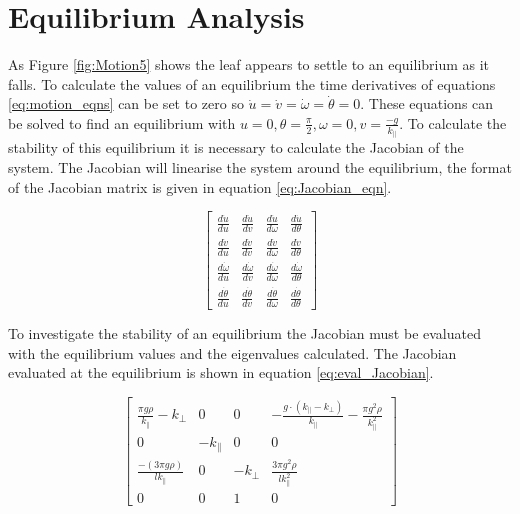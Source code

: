 \section{Equilibrium Analysis}

As Figure \ref{fig:Motion5} shows the leaf appears to settle to an equilibrium as it falls. To calculate the values of an equilibrium the time derivatives of equations \ref{eq:motion_eqns} %
can be set to zero so $\dot{u} = \dot{v} = \dot{\omega} = \dot{\theta} = 0$. These equations can be solved to find an equilibrium with $u=0, \theta=\frac{\pi}{2},\omega=0,v=\frac{-g}{k_{\parallel}}$. To calculate the stability of this equilibrium it is necessary to calculate the Jacobian of the system. The Jacobian will linearise the system around the equilibrium, the format of the Jacobian matrix is given in equation \ref{eq:Jacobian_eqn}.

\begin{equation}\label{eq:Jacobian_eqn}
\begin{bmatrix}
\frac{d\dot{u}}{du}&\frac{d\dot{u}}{dv}&\frac{d\dot{u}}{d\omega}&\frac{d\dot{u}}{d\theta}\\
\frac{d\dot{v}}{du}&\frac{d\dot{v}}{dv}&\frac{d\dot{v}}{d\omega}&\frac{d\dot{v}}{d\theta}\\
\frac{d\dot{\omega}}{du}&\frac{d\dot{\omega}}{dv}&\frac{d\dot{\omega}}{d\omega}&\frac{d\dot{\omega}}{d\theta}\\
\frac{d\dot{\theta}}{du}&\frac{d\dot{\theta}}{dv}&\frac{d\dot{\theta}}{d\omega}&\frac{d\dot{\theta}}{d\theta}
\end{bmatrix}
\end{equation}



To investigate the stability of an equilibrium the Jacobian must be evaluated with the equilibrium values and the eigenvalues calculated. The Jacobian evaluated at the equilibrium is shown in equation \ref{eq:eval_Jacobian}.

\begin{equation}\label{eq:eval_Jacobian}
\begin{bmatrix}
 \frac{\pi g \rho}{k_{\parallel}}-k_{\perp}&0&0&-\frac{g\cdot(k_{\parallel}-k_{\perp})}{k_{\parallel}}-\frac{\pi g^2 \rho}{k_{\parallel}^2}\\
0&-k_{\parallel}&0&0\\
 \frac{-(3 \pi g \rho)}{l k_{\parallel}}&0&-k_{\perp}&\frac{3 \pi g^2 \rho}{l k_{\parallel}^2}\\
0&0&1&0
\end{bmatrix}
\end{equation}

